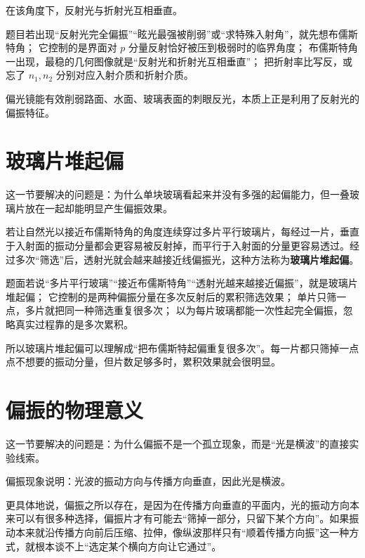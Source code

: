 \documentclass[lang=cn,11pt]{elegantbook}
\newcommand{\bridge}[1]{\begin{note}#1\end{note}}
\begin{document}
在该角度下，反射光与折射光互相垂直。

\begin{note}
 题目若出现“反射光完全偏振”“眩光最强被削弱”或“求特殊入射角”，就先想布儒斯特角； 它控制的是界面对 \(p\) 分量反射恰好被压到极弱时的临界角度； 布儒斯特角一出现，最稳的几何图像就是“反射光和折射光互相垂直”； 把折射率比写反，或忘了 \(n_1,n_2\) 分别对应入射介质和折射介质。
\end{note}

\bridge{偏光镜能有效削弱路面、水面、玻璃表面的刺眼反光，本质上正是利用了反射光的偏振特征。}

\section{玻璃片堆起偏}

这一节要解决的问题是：为什么单块玻璃看起来并没有多强的起偏能力，但一叠玻璃片放在一起却能明显产生偏振效果。

若让自然光以接近布儒斯特角的角度连续穿过多片平行玻璃片，每经过一片，垂直于入射面的振动分量都会更容易被反射掉，而平行于入射面的分量更容易透过。经过多次“筛选”后，透射光就会越来越接近线偏振光，这种方法称为\textbf{玻璃片堆起偏}。

\begin{note}
 题面若说“多片平行玻璃”“接近布儒斯特角”“透射光越来越接近偏振”，就是玻璃片堆起偏； 它控制的是两种偏振分量在多次反射后的累积筛选效果； 单片只筛一点，多片就把同一种筛选重复很多次； 以为每片玻璃都能一次性起完全偏振，忽略真实过程靠的是多次累积。
\end{note}

\begin{remark}
所以玻璃片堆起偏可以理解成“把布儒斯特起偏重复很多次”。每一片都只筛掉一点点不想要的振动分量，但片数足够多时，累积效果就会很明显。
\end{remark}

\section{偏振的物理意义}

这一节要解决的问题是：为什么偏振不是一个孤立现象，而是“光是横波”的直接实验线索。

偏振现象说明：光波的振动方向与传播方向垂直，因此光是横波。

更具体地说，偏振之所以存在，是因为在传播方向垂直的平面内，光的振动方向本来可以有很多种选择，偏振片才有可能去“筛掉一部分，只留下某个方向”。如果振动本来就沿传播方向前后压缩、拉伸，像纵波那样只有“顺着传播方向振”这一种方式，就根本谈不上“选定某个横向方向让它通过”。
\end{document}
